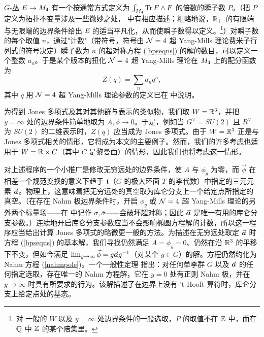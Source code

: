 $G$-丛 $E\to \MM$ 有一个按通常方式定义为 $\int_{\MM}\Tr\,
F\wedge F$ 的倍数的瞬子数 $P$。（把 $P$ 定义为拓扑不变量涉及一些微妙之处，\cite{fiveknots} 中有相应描述；粗略地说，$\R_+$ 的有限端与无限端的边界条件给出 $E$ 的适当平凡化，从而使瞬子数得以定义。\footnote{对
 一般的 $W$ 以及 $y=\infty$ 处边界条件的一般选取，$P$ 的取值不在 $\Z$ 中，而在 $\Q$ 中 $\Z$ 的某个陪集里。}）对瞬子数的每个取值 $n$，通过"计数"（带符号，符号由 $\N=4$ 超 Yang-Mills 理论费米子行列式的符号决定）瞬子数为 $n$ 的超对称方程 (\ref{bpseqns}) 的解的数目，可以定义一个整数 $a_n$。于是某个版本的扭化 $\N=4$ 超 Yang-Mills 理论在 $\MM$ 上的配分函数为
\begin{equation}\label{partfn} Z(q)=\sum_n a_nq^n, \end{equation}
其中 $q$ 用 $\N=4$ 超 Yang-Mills 理论参数的定义已在 \cite{fiveknots} 中说明。

为得到 Jones 多项式及其对其他群与表示的类似物，我们取 $W=\R^3$，并把 $y=\infty$ 处的边界条件简单地取为 $A,\phi\to 0$。于是，例如当 $G^\vee=SU(2)$ 且 $R^\vee$ 为 $SU(2)$ 的二维表示时，$Z(q)$ 应当成为 Jones 多项式。由于 $W=\R^3$ 正是与 Jones 多项式相关的情形，它将成为本文的主要例子。然而，我们的许多考虑也适用于 $W=\R\times C$（其中 $C$ 是黎曼面）的情形，因此我们也将考虑这一情形。

对上述程序的一个小推广是修改无穷远处的边界条件，使 $A$ 与 $\phi_y$ 为零，而 $\vec\phi$ 在相差一个规范变换的意义下趋于 $\frak t$（$G$ 的极大环面 $T$ 的李代数）中指定的三元元素 $\vec \ca$。物理上，这意味着把无穷远处的真空取为库仑分支上一个给定点所指定的真空。（在存在 Nahm 极边界条件时，开启 $\phi_y$ 或 $\N=4$ 超 Yang-Mills 理论的另外两个标量场——在 \cite{fiveknots} 中记作 $\sigma,\bar\sigma$——会破坏超对称；因此 $\vec \ca$ 是唯一有用的库仑分支参数。）连续地开启库仑分支参数应当不会影响椭圆方程解的计数，所以这一程序应当给出计算 Jones 多项式的略微更一般的方法。为描述在无穷远处取定 $\vec \ca$ 时方程 (\ref{bpseqns}) 的基本解，我们寻找仍然满足 $A=\phi_y=0$、仍然在沿 $\R^3$ 的平移下不变，但如今满足 $\lim_{y\to\infty}\vec\phi = g \vec \ca g^{-1}$（对某个 $g\in G$）的解。方程仍然约化为 Nahm 方程 (\ref{nahmpole})。一个一般性定理 \cite{Krontwo} 指出：对任何单李群 $G$ 以及 $\vec \ca$ 的任何指定选取，存在唯一的 Nahm 方程解，它在 $y=0$ 处有正则 Nahm 极，并在 $y\to \infty$ 时具有所要求的行为。该解描述了在边界上没有 't Hooft 算符时，库仑分支上给定点处的基态。

